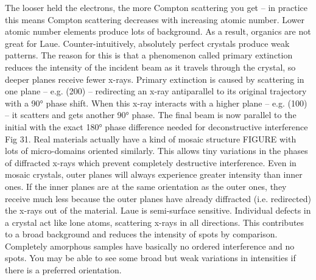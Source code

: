 The looser held the electrons, the more Compton scattering you get – in practice this means Compton scattering decreases with increasing atomic number. Lower atomic number elements produce lots of background. As a result, organics are not great for Laue.
Counter-intuitively, absolutely perfect crystals produce weak patterns. The reason for this is that a phenomenon called primary extinction reduces the intensity of the incident beam as it travels through the crystal, so deeper planes receive fewer x-rays. Primary extinction is caused by scattering in one plane – e.g. (200) – redirecting an x-ray antiparallel to its original trajectory with a 90° phase shift. When this x-ray interacts with a higher plane – e.g. (100) – it scatters and gets another 90° phase. The final beam is now parallel to the initial with the exact 180° phase difference needed for deconstructive interference Fig 31.
Real materials actually have a kind of mosaic structure FIGURE with lots of micro-domains oriented similarly. This allows tiny variations in the phases of diffracted x-rays which prevent completely destructive interference.
Even in mosaic crystals, outer planes will always experience greater intensity than inner ones. If the inner planes are at the same orientation as the outer ones, they receive much less because the outer planes have already diffracted (i.e. redirected) the x-rays out of the material. Laue is semi-surface sensitive.
Individual defects in a crystal act like lone atoms, scattering x-rays in all directions. This contributes to a broad background and reduces the intensity of spots by comparison. Completely amorphous samples have basically no ordered interference and no spots. You may be able to see some broad but weak variations in intensities if there is a preferred orientation.
